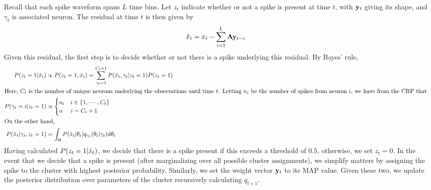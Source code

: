 Recall that each spike waveform spans $L$ time bins. 
Let $z_t$ indicate whether or not a spike is present at time $t$, with $\mathbf{y}_t$ giving its shape, and $\gamma_t$ is associated neuron. 
The residual at time $t$ is then given by
\begin{align}
  \tilde{x}_t = x_t - \sum_{i=1}^L \mathbf{A}\mathbf{y}_{t-i} \label{eq:resid}
\end{align}
Given this residual, the first step is to decide whether or not there is a spike underlying this residual.
By Bayes' rule,
\begin{align}
  P(z_t = 1 | \tilde{x}_t)  &\propto P(z_t = 1, \tilde{x}_t) = \sum_{\gamma_t = 1}^{C_t+1} P(\tilde{x}_t, {\gamma_t} | z_t = 1) P(z_t = 1) \\
\intertext{Here, $C_t$ is the number of unique neurons underlying the observations until time $t$. Letting $n_i$ be the number of spikes from neuron $i$,
we have from the CRP that}
  P({\gamma_t} = i | z_t = 1) & \propto 
  \begin{cases}
   n_i \quad i \in \{1,\cdots, C_t\} \\
   \alpha \quad\ i = C_t + 1 \\
  \end{cases}\\
\intertext{On the other hand,}
  P(\tilde{x}_t | {\gamma_t} , z_t = 1) &= \int_{\Theta} P(\tilde{x}_t | \theta_t) q_{\gamma_t} (\theta_t | \gamma_t) \mathrm{d} \theta_t
\end{align}
Having calculated $P(z_t = 1 | \tilde{x}_t)$, we decide that there is a spike present if this exceeds a threshold of $0.5$, otherwise, we set $z_t = 0$.
In the event that we decide that a spike is present (after marginalizing over all possible cluster assignments), we simplify matters by assigning 
the spike to the cluster with highest posterior probability. Similarly, we set the weight vector $\mathbf{y}_t$ to its MAP value.
Given these two, we update the posterior distribution over parameters of the cluster recursively calculating $q_{t+1}$.

